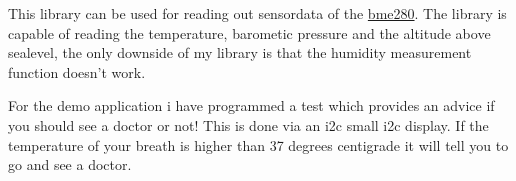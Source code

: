 This library can be used for reading out sensordata of the \hyperlink{classbme280}{bme280}. The library is capable of reading the temperature, barometic pressure and the altitude above sealevel, the only downside of my library is that the humidity measurement function doesn’t work.

For the demo application i have programmed a test which provides an advice if you should see a doctor or not! This is done via an i2c small i2c display. If the temperature of your breath is higher than 37 degrees centigrade it will tell you to go and see a doctor. 